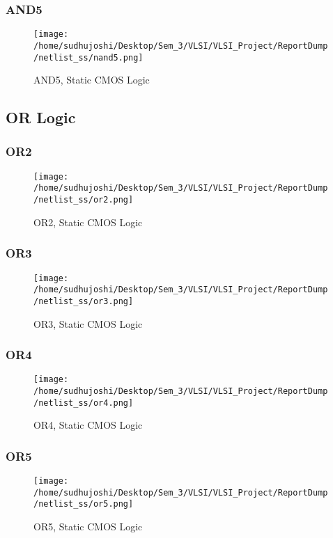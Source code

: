 \documentclass[conference]{IEEEtran}
\begin{document}
\subsubsection{AND5}
\begin{figure}[H] 
    \centering
    \texttt{[image: /home/sudhujoshi/Desktop/Sem\_3/VLSI/VLSI\_Project/ReportDump/netlist\_ss/nand5.png]}
    \caption{AND5, Static CMOS Logic} 
\end{figure}

\subsection{OR Logic}
\subsubsection{OR2}
\begin{figure}[H] 
    \centering
    \texttt{[image: /home/sudhujoshi/Desktop/Sem\_3/VLSI/VLSI\_Project/ReportDump/netlist\_ss/or2.png]}
    \caption{OR2, Static CMOS Logic} 
\end{figure}

\subsubsection{OR3}
\begin{figure}[H] 
    \centering
    \texttt{[image: /home/sudhujoshi/Desktop/Sem\_3/VLSI/VLSI\_Project/ReportDump/netlist\_ss/or3.png]}
    \caption{OR3, Static CMOS Logic} 
\end{figure}

\subsubsection{OR4}
\begin{figure}[H]
    \centering
    \texttt{[image: /home/sudhujoshi/Desktop/Sem\_3/VLSI/VLSI\_Project/ReportDump/netlist\_ss/or4.png]}
    \caption{OR4, Static CMOS Logic} 
\end{figure}

\subsubsection{OR5}
\begin{figure}[H]
    \centering
    \texttt{[image: /home/sudhujoshi/Desktop/Sem\_3/VLSI/VLSI\_Project/ReportDump/netlist\_ss/or5.png]}
    \caption{OR5, Static CMOS Logic} 
\end{figure}
\end{document}
